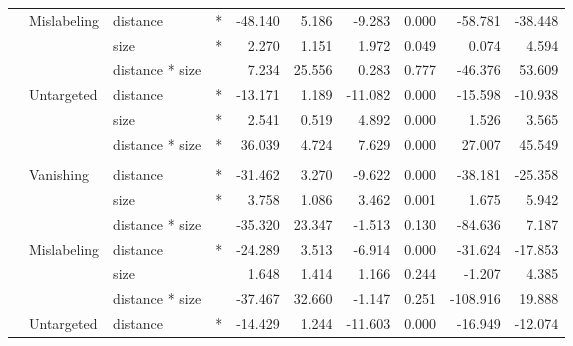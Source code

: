 \begin{longtable}[t]{llllrrrrrr}
\cmidrule{2-10}\nopagebreak
\hspace{1em} & Mislabeling & distance & * & -48.140 & 5.186 & -9.283 & 0.000 & -58.781 & -38.448\\
\cmidrule{3-10}\nopagebreak
\hspace{1em} &  & size & * & 2.270 & 1.151 & 1.972 & 0.049 & 0.074 & 4.594\\
\cmidrule{3-10}\nopagebreak
\hspace{1em} &  & distance * size &  & 7.234 & 25.556 & 0.283 & 0.777 & -46.376 & 53.609\\
\cmidrule{2-10}\nopagebreak
\hspace{1em} & Untargeted & distance & * & -13.171 & 1.189 & -11.082 & 0.000 & -15.598 & -10.938\\
\cmidrule{3-10}\nopagebreak
\hspace{1em} &  & size & * & 2.541 & 0.519 & 4.892 & 0.000 & 1.526 & 3.565\\
\cmidrule{3-10}\nopagebreak
\hspace{1em} &  & distance * size & * & 36.039 & 4.724 & 7.629 & 0.000 & 27.007 & 45.549\\
\cmidrule{1-10}\pagebreak[0]
\addlinespace[0.3em]
\multicolumn{10}{l}{\textbf{Faster R-CNN}}\\
\hspace{1em} & Vanishing & distance & * & -31.462 & 3.270 & -9.622 & 0.000 & -38.181 & -25.358\\
\cmidrule{3-10}\nopagebreak
\hspace{1em} &  & size & * & 3.758 & 1.086 & 3.462 & 0.001 & 1.675 & 5.942\\
\cmidrule{3-10}\nopagebreak
\hspace{1em} &  & distance * size &  & -35.320 & 23.347 & -1.513 & 0.130 & -84.636 & 7.187\\
\cmidrule{2-10}\nopagebreak
\hspace{1em} & Mislabeling & distance & * & -24.289 & 3.513 & -6.914 & 0.000 & -31.624 & -17.853\\
\cmidrule{3-10}\nopagebreak
\hspace{1em} &  & size &  & 1.648 & 1.414 & 1.166 & 0.244 & -1.207 & 4.385\\
\cmidrule{3-10}\nopagebreak
\hspace{1em} &  & distance * size &  & -37.467 & 32.660 & -1.147 & 0.251 & -108.916 & 19.888\\
\cmidrule{2-10}\nopagebreak
\hspace{1em} & Untargeted & distance & * & -14.429 & 1.244 & -11.603 & 0.000 & -16.949 & -12.074\\

\end{longtable}
